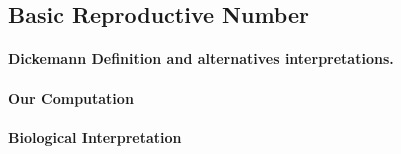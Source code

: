 \subsection{Basic Reproductive Number}
\paragraph{Dickemann Definition and alternatives interpretations.}
\paragraph{Our Computation}
\paragraph{Biological Interpretation}